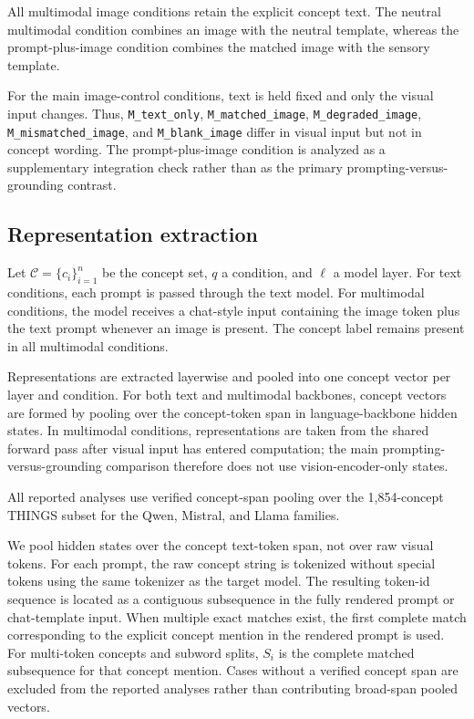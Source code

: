 \documentclass{article}
\begin{document}
All multimodal image conditions retain the explicit concept text. The neutral multimodal condition combines an image with the neutral template, whereas the prompt-plus-image condition combines the matched image with the sensory template.

For the main image-control conditions, text is held fixed and only the visual input changes. Thus, \texttt{M\_text\_only}, \texttt{M\_matched\_image}, \texttt{M\_degraded\_image}, \texttt{M\_mismatched\_image}, and \texttt{M\_blank\_image} differ in visual input but not in concept wording. The prompt-plus-image condition is analyzed as a supplementary integration check rather than as the primary prompting-versus-grounding contrast.

\subsection{Representation extraction}

Let \(\mathcal{C}=\{c_i\}_{i=1}^n\) be the concept set, \(q\) a condition, and \(\ell\) a model layer. For text conditions, each prompt is passed through the text model. For multimodal conditions, the model receives a chat-style input containing the image token plus the text prompt whenever an image is present. The concept label remains present in all multimodal conditions.

Representations are extracted layerwise and pooled into one concept vector per layer and condition. For both text and multimodal backbones, concept vectors are formed by pooling over the concept-token span in language-backbone hidden states. In multimodal conditions, representations are taken from the shared forward pass after visual input has entered computation; the main prompting-versus-grounding comparison therefore does not use vision-encoder-only states.

All reported analyses use verified concept-span pooling over the 1,854-concept THINGS subset for the Qwen, Mistral, and Llama families.

We pool hidden states over the concept text-token span, not over raw visual tokens. For each prompt, the raw concept string is tokenized without special tokens using the same tokenizer as the target model. The resulting token-id sequence is located as a contiguous subsequence in the fully rendered prompt or chat-template input. When multiple exact matches exist, the first complete match corresponding to the explicit concept mention in the rendered prompt is used. For multi-token concepts and subword splits, \(S_i\) is the complete matched subsequence for that concept mention. Cases without a verified concept span are excluded from the reported analyses rather than contributing broad-span pooled vectors.
\end{document}
